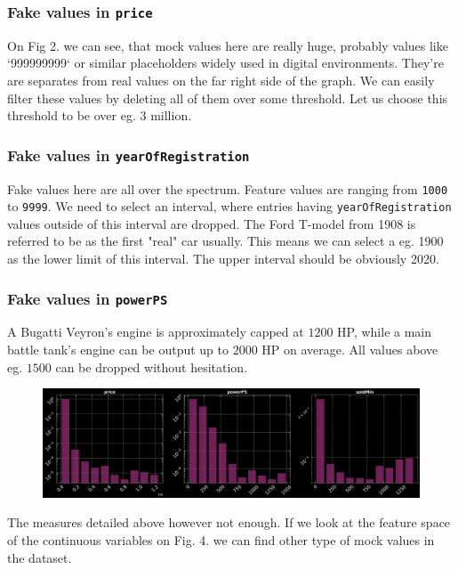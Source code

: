 \subsubsection{Fake values in \texttt{price}}
On Fig 2. we can see, that mock values here are really huge, probably values like `999999999` or similar placeholders widely used in digital environments. They're are separates from real values on the far right side of the graph. We can easily filter these values by deleting all of them over some threshold. Let us choose this threshold to be over eg. $3$ million.

\subsubsection{Fake values in \texttt{yearOfRegistration}}
Fake values here are all over the spectrum. Feature values are ranging from \texttt{1000} to \texttt{9999}. We need to select an interval, where entries having \texttt{yearOfRegistration} values outside of this interval are dropped. The Ford T-model from 1908 is referred to be as the first "real" car usually. This means we can select a eg. 1900 as the lower limit of this interval. The upper interval should be obviously 2020.

\subsubsection{Fake values in \texttt{powerPS}}
A Bugatti Veyron's engine is approximately capped at $1200$ HP, while a main battle tank's engine can be output up to $2000$ HP on average. All values above eg. $1500$ can be dropped without hesitation.

\begin{figure}[h]
	\begin{center}
		\includegraphics[width=\linewidth]{./images/fig_2_dist_after.png}
	\end{center}
\end{figure}
The measures detailed above however not enough. If we look at the feature space of the continuous variables on Fig. 4. we can find other type of mock values in the dataset.

